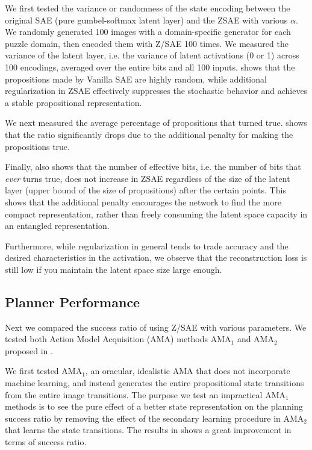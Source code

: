 We first tested the variance or randomness of the state encoding between
the original SAE (pure gumbel-softmax latent layer) and the ZSAE with various $\alpha$.
We randomly generated 100 images with a domain-specific generator for each puzzle domain,
then encoded them with Z/SAE 100 times.
We measured the variance of the latent layer, i.e. the variance of latent activations (0 or 1)
across 100 encodings, averaged over the entire bits and all 100 inputs.
 shows that the propositions made by Vanilla SAE are highly random,
while additional regularization in ZSAE effectively suppresses the stochastic behavior
and achieves a stable propositional representation.

We next measured the average percentage of propositions that turned true.
 shows that the ratio significantly drops due to the additional penalty
for making the propositions true.

Finally,  also shows that the number of effective bits,
i.e. the number of bits that \emph{ever} turns true, does not increase in ZSAE
regardless of the size of the latent layer (upper bound of the size of
propositions) after the certain points.  This shows that the additional
penalty encourages the network to find the more compact representation,
rather than freely consuming the latent space capacity in an entangled representation.

Furthermore, while regularization in general tends to trade accuracy and
the desired characteristics in the activation, we observe that the
reconstruction loss is still low if you maintain the latent space size
large enough.

\subsection{Planner Performance}

Next we compared the success ratio of \latentplanner using Z/SAE with various parameters.
We tested both Action Model Acquisition (AMA) methods AMA$_1$ and AMA$_2$ proposed in \cite{Asai2018}.

We first tested AMA$_1$, an oracular, idealistic AMA that does not incorporate machine learning,
and instead generates the entire propositional state transitions from the entire image transitions.
The purpose we test an impractical AMA$_1$ methods is
to see the pure effect of a better state representation on the planning success ratio
by removing the effect of the secondary learning procedure in AMA$_2$ that learns the state transitions.
The results in  shows a great improvement in terms of success ratio.

